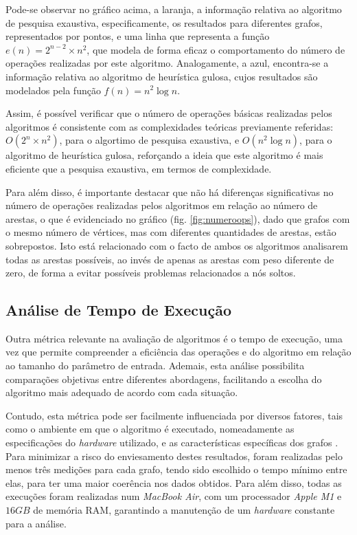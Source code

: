 \documentclass[mirror]{revdetua}
\begin{document}
Pode-se observar no gráfico acima, a laranja, a informação relativa ao algoritmo de pesquisa exaustiva, especificamente, os resultados para diferentes grafos, representados por pontos, e uma linha que representa a função $e(n) = 2^{n-2} \times n^2$, que modela de forma eficaz o comportamento do número de operações realizadas por este algoritmo. Analogamente, a azul, encontra-se a informação relativa ao algoritmo de heurística gulosa, cujos resultados são modelados pela função $f(n) = n^2 \log n$.

Assim, é possível verificar que o número de operações básicas realizadas pelos algoritmos é consistente com as complexidades teóricas previamente referidas: $O(2^n \times n^2)$, para o algortimo de pesquisa exaustiva, e $O(n^2 \log n)$, para o algoritmo de heurística gulosa, reforçando a ideia que este algoritmo é mais eficiente que a pesquisa exaustiva, em termos de complexidade.

Para além disso, é importante destacar que não há diferenças significativas no número de operações realizadas pelos algoritmos em relação ao número de arestas, o que é evidenciado no gráfico (fig. \ref{fig:numeroops}), dado que grafos com o mesmo número de vértices, mas com diferentes quantidades de arestas, estão sobrepostos. Isto está relacionado com o facto de ambos os algoritmos analisarem todas as arestas possíveis, ao invés de apenas as arestas com peso diferente de zero, de forma a evitar possíveis problemas relacionados a nós soltos.


\subsection{Análise de Tempo de Execução}

Outra métrica relevante na avaliação de algoritmos é o tempo de execução, uma vez que permite compreender a eficiência das operações e do algoritmo em relação ao tamanho do parâmetro de entrada. Ademais, esta análise possibilita comparações objetivas entre diferentes abordagens, facilitando a escolha do algoritmo mais adequado de acordo com cada situação.

Contudo, esta métrica pode ser facilmente influenciada por diversos fatores, tais como o ambiente em que o algoritmo é executado, nomeadamente as especificações do \textit{hardware} utilizado, e as características específicas dos grafos \cite{NP15}. Para minimizar a risco do enviesamento destes resultados, foram realizadas pelo menos três medições para cada grafo, tendo sido escolhido o tempo mínimo entre elas, para ter uma maior coerência nos dados obtidos. Para além disso, todas as execuções foram realizadas num \textit{MacBook Air}, com um processador \textit{Apple M1} e $16GB$ de memória RAM, garantindo a manutenção de um \textit{hardware} constante para a análise.
\end{document}
